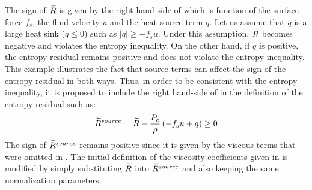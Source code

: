 %
The sign of $\widetilde{R}$ is given by the right hand-side of  which is function of the surface force $f_s$, the fluid velocity $u$ and the heat source term $q$. Let us assume that $q$ is a large heat sink ($q\leq0$) such as $| q| \geq -f_s u$. Under this assumption, $\widetilde{R}$ becomes negative and violates the entropy inequality. On the other hand, if $q$ is positive, the entropy residual remains positive and does not violate the entropy inequality. This example illustrates the fact that source terms can affect the sign of the entropy residual in both ways. Thus, in order to be consistent with the entropy inequality, it is proposed to include the right hand-side of  in the definition of the entropy residual such as:
%
\begin{equation}\label{eq:ent_res_source_term3}
\widetilde{R}^{source} = \widetilde{R} - \frac{P_e}{\rho} \left( -f_s u + q \right) \geq 0
\end{equation}
%
The sign of $\widetilde{R}^{source}$ remains positive since it is given by the viscous terms that were omitted in . The initial definition of the viscosity coefficients given in  is modified by simply substituting $\widetilde{R}$ into $\widetilde{R}^{source}$ and also keeping the same normalization parameters.

